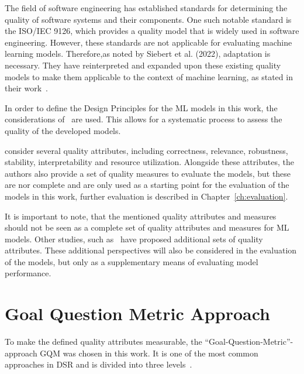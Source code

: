The field of software engineering has established standards for determining the quality of software systems and their
components.
One such notable standard is the ISO/IEC 9126, which provides a quality model that is widely used in
software engineering.
However, these standards are not applicable for evaluating machine learning models.
Therefore,as noted by Siebert et al. (2022), adaptation is necessary.
They have reinterpreted and expanded upon these existing quality models to make them applicable to the context of
machine learning, as stated in their work~\cite[p. 1]{siebert2022construction}.

In order to define the Design Principles for the \ac{ML} models in this work, the
considerations of~\cite[]{siebert2022construction} are used.
This allows for a systematic process to assess the quality of the developed models.

\cite{siebert2022construction} consider several quality attributes, including
correctness, relevance, robustness, stability, interpretability and resource utilization.
Alongside these attributes, the authors also provide a set of quality measures to evaluate the
models, but these are nor complete and are only used as a starting point for the evaluation of the
models in this work, further evaluation is described in Chapter~\ref{ch:evaluation}.

It is important to note, that the mentioned quality attributes and measures should
not be seen as a complete set of quality attributes and measures for \ac{ML} models.
Other studies, such as~\cite{zhang2020machine} have proposed additional sets of quality attributes.
These additional perspectives will also be considered in the evaluation of the models, but only
as a supplementary means of evaluating model performance.


\section{Goal Question Metric Approach}\label{subsec:goal-question-metric-approach}
To make the defined quality attributes measurable, the “Goal-Question-Metric”-approach \ac{GQM}
was chosen in this work.
It is one of the most common approaches in DSR and is divided into three levels~\cite[p. 3]{basili_goalquestionmetric_}.

